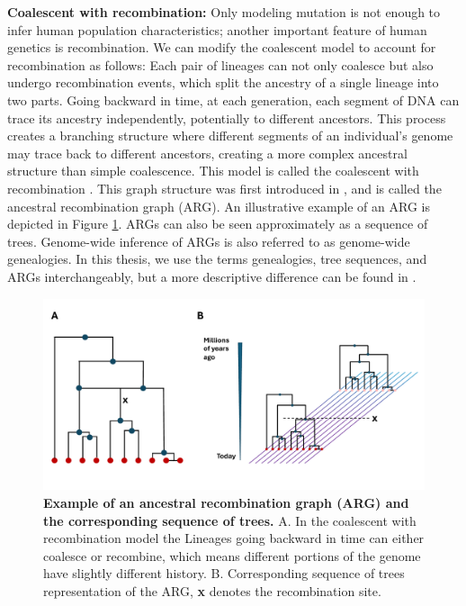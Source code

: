 \textbf{Coalescent with recombination:} Only modeling mutation is not enough to infer human population characteristics; another important feature of human genetics is recombination. We can modify the coalescent model to account for recombination as follows: Each pair of lineages can not only coalesce but also undergo recombination events, which split the ancestry of a single lineage into two parts. Going backward in time, at each generation, each segment of DNA can trace its ancestry independently, potentially to different ancestors. This process creates a branching structure where different segments of an individual's genome may trace back to different ancestors, creating a more complex ancestral structure than simple coalescence. This model is called the coalescent with recombination \cite{Hudson1983}. This graph structure was first introduced in \cite{Griffiths1997}, and is called the ancestral recombination graph (ARG). An illustrative example of an ARG is depicted in Figure \ref{fig:arg}. ARGs can also be seen approximately as a sequence of trees. Genome-wide inference of ARGs is also referred to as genome-wide genealogies. In this thesis, we use the terms genealogies, tree sequences, and ARGs interchangeably, but a more descriptive difference can be found in \cite{wong2023general}.

\begin{figure}[h!]
    \centering
    \includegraphics[width=\linewidth]{figures/coalescent_arg.pdf}
    \caption{\textbf{Example of an ancestral recombination graph (ARG) and the corresponding sequence of trees.} A. In the coalescent with recombination model the Lineages going backward in time can either coalesce or recombine, which means different portions of the genome have slightly different history. B. Corresponding sequence of trees representation of the ARG, \textbf{x} denotes the recombination site.}
    \label{fig:arg}
\end{figure}


